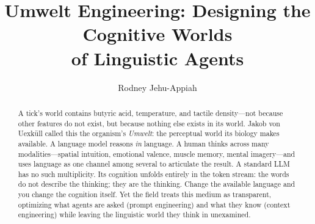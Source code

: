 \documentclass[11pt,a4paper]{article}
\title{\textbf{Umwelt Engineering: Designing the Cognitive Worlds\\of Linguistic Agents}}
\author{Rodney Jehu-Appiah}
\date{}
\begin{document}
\maketitle

\begin{abstract}
A tick's world contains butyric acid, temperature, and tactile density---not because other features do not exist, but because nothing else exists in its world. Jakob von Uexk\"{u}ll called this the organism's \emph{Umwelt}: the perceptual world its biology makes available. A language model reasons \emph{in} language. A human thinks across many modalities---spatial intuition, emotional valence, muscle memory, mental imagery---and uses language as one channel among several to articulate the result. A standard LLM has no such multiplicity. Its cognition unfolds entirely in the token stream: the words do not describe the thinking; they are the thinking. Change the available language and you change the cognition itself. Yet the field treats this medium as transparent, optimizing what agents are asked (prompt engineering) and what they know (context engineering) while leaving the linguistic world they think in unexamined.


\end{abstract}
\end{document}
